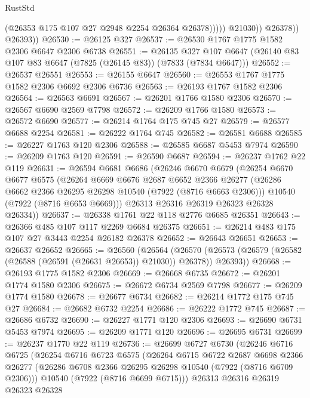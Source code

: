 \begin{lexlean}{RustStd}
\begin{coremodule}
                        (@26353 @175 @107 @27 @2948 @2254 @26364 @26378)))))
                @21030))
            @26378))
        @26393))
@26530 := @26125 @327
@26537 := @26530 @1767 @1775 @1582 @2306 @6647 @2306 @6738
@26551 := @26135
    @327
    @107
    @6647
    (@26140 @83 @107 @83 @6647 (@7825 (@26145 @83)) (@7833 (@7834 @6647)))
@26552 := @26537 @26551
@26553 := @26155 @6647
@26560 := @26553 @1767 @1775 @1582 @2306 @6692 @2306 @6736
@26563 := @26193 @1767 @1582 @2306
@26564 := @26563 @6691
@26567 := @26201 @1766 @1580 @2306
@26570 := @26567 @6690 @2569 @7798
@26572 := @26209 @1766 @1580
@26573 := @26572 @6690
@26577 := @26214 @1764 @175 @745 @27
@26579 := @26577 @6688 @2254
@26581 := @26222 @1764 @745
@26582 := @26581 @6688
@26585 := @26227 @1763 @120 @2306
@26588 := @26585 @6687 @5453 @7974
@26590 := @26209 @1763 @120
@26591 := @26590 @6687
@26594 := @26237 @1762 @22 @119
@26631 := @26594
    @6681
    @6686
    (@26246
      @6670
      @6679
      (@26254
        @6670
        @6677
        @6575
        (@26264
          @6669
          @6676
          @2687
          @6652
          @2366
          @26277
          (@26286 @6662 @2366 @26295 @26298 @10540 (@7922 (@8716 @6663 @2306)))
          @10540
          (@7922 (@8716 @6653 @6669)))
        @26313
        @26316
        @26319
        @26323
        @26328
        @26334))
@26637 := @26338 @1761 @22 @118 @2776 @6685 @26351
@26643 := @26366 @485 @107 @117 @2269 @6684 @26375
@26651 := @26214 @483 @175 @107 @27 @3443 @2254 @26182 @26378
@26652 := @26643 @26651
@26653 := @26637 @26652
@26665 := @26560
    (@26564
      (@26570 (@26573 (@26579 (@26582 (@26588 (@26591 (@26631 @26653)) @21030)) @26378)) @26393))
@26668 := @26193 @1775 @1582 @2306
@26669 := @26668 @6735
@26672 := @26201 @1774 @1580 @2306
@26675 := @26672 @6734 @2569 @7798
@26677 := @26209 @1774 @1580
@26678 := @26677 @6734
@26682 := @26214 @1772 @175 @745 @27
@26684 := @26682 @6732 @2254
@26686 := @26222 @1772 @745
@26687 := @26686 @6732
@26690 := @26227 @1771 @120 @2306
@26693 := @26690 @6731 @5453 @7974
@26695 := @26209 @1771 @120
@26696 := @26695 @6731
@26699 := @26237 @1770 @22 @119
@26736 := @26699
    @6727
    @6730
    (@26246
      @6716
      @6725
      (@26254
        @6716
        @6723
        @6575
        (@26264
          @6715
          @6722
          @2687
          @6698
          @2366
          @26277
          (@26286 @6708 @2366 @26295 @26298 @10540 (@7922 (@8716 @6709 @2306)))
          @10540
          (@7922 (@8716 @6699 @6715)))
        @26313
        @26316
        @26319
        @26323
        @26328

\end{coremodule}
\end{lexlean}
